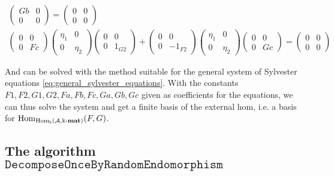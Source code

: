 \begin{example}
\begin{subequations}
\begin{align}
\begin{pmatrix} Gb & 0 \\ 0 & 0 \end{pmatrix} = \begin{pmatrix} 0 & 0 \\ 0 & 0 \end{pmatrix} \\
\begin{pmatrix} 0 & 0 \\ 0 & Fc \end{pmatrix} \begin{pmatrix} \eta_{1} & 0 \\ 0 & \eta_{2} \end{pmatrix}
\begin{pmatrix}0 & 0 \\ 0 & 1_{G2} \end{pmatrix}
+ \begin{pmatrix} 0 & 0 \\ 0 & -1_{F2} \end{pmatrix} \begin{pmatrix} \eta_{1} & 0 \\ 0 & \eta_{2} \end{pmatrix}
\begin{pmatrix} 0 & 0 \\ 0 & Gc \end{pmatrix} = \begin{pmatrix} 0 & 0 \\ 0 & 0 \end{pmatrix} 
\end{align}
\end{subequations}

And can be solved with the method suitable for the general system of Sylvester equations \eqref{eq:general_sylvester_equations}.
With the constants $F1, F2, G1, G2, Fa, Fb, Fc, Ga, Gb, Gc$ given as coefficients for the equations, we can thus solve the system and
get a finite basis of the external hom, i.e. a basis for $\mathrm{Hom}_{\mathrm{Hom_{\Bbbk}}(\mathcal{A},\Bbbk\textnormal{-}\mathbf{mat})}(F,G)$.
\end{example}

\subsection{The algorithm $\mathtt{DecomposeOnceByRandomEndomorphism}$}

